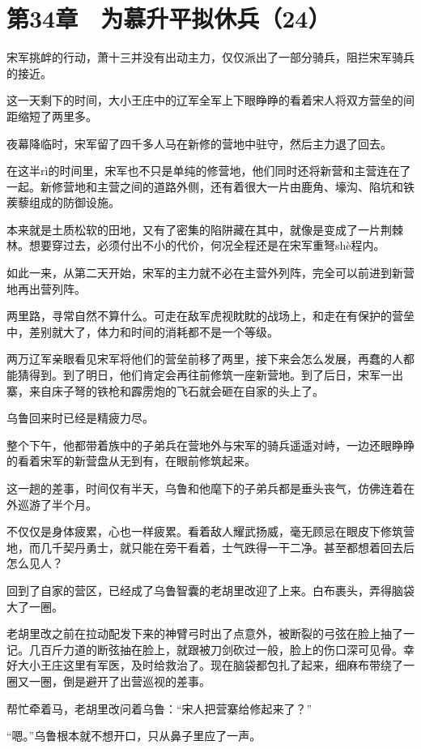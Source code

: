 \section{第34章　为慕升平拟休兵（24）}

宋军挑衅的行动，萧十三并没有出动主力，仅仅派出了一部分骑兵，阻拦宋军骑兵的接近。

这一天剩下的时间，大小王庄中的辽军全军上下眼睁睁的看着宋人将双方营垒的间距缩短了两里多。

夜幕降临时，宋军留了四千多人马在新修的营地中驻守，然后主力退了回去。

在这半rì的时间里，宋军也不只是单纯的修营地，他们同时还将新营和主营连在了一起。新修营地和主营之间的道路外侧，还有着很大一片由鹿角、壕沟、陷坑和铁蒺藜组成的防御设施。

本来就是土质松软的田地，又有了密集的陷阱藏在其中，就像是变成了一片荆棘林。想要穿过去，必须付出不小的代价，何况全程还是在宋军重弩shè程内。

如此一来，从第二天开始，宋军的主力就不必在主营外列阵，完全可以前进到新营地再出营列阵。

两里路，寻常自然不算什么。可走在敌军虎视眈眈的战场上，和走在有保护的营垒中，差别就大了，体力和时间的消耗都不是一个等级。

两万辽军亲眼看见宋军将他们的营垒前移了两里，接下来会怎么发展，再蠢的人都能猜得到。到了明日，他们肯定会再往前修筑一座新营地。到了后日，宋军一出寨，来自床子弩的铁枪和霹雳炮的飞石就会砸在自家的头上了。

乌鲁回来时已经是精疲力尽。

整个下午，他都带着族中的子弟兵在营地外与宋军的骑兵遥遥对峙，一边还眼睁睁的看着宋军的新营盘从无到有，在眼前修筑起来。

这一趟的差事，时间仅有半天，乌鲁和他麾下的子弟兵都是垂头丧气，仿佛连着在外巡游了半个月。

不仅仅是身体疲累，心也一样疲累。看着敌人耀武扬威，毫无顾忌在眼皮下修筑营地，而几千契丹勇士，就只能在旁干看着，士气跌得一干二净。甚至都想着回去后怎么见人？

回到了自家的营区，已经成了乌鲁智囊的老胡里改迎了上来。白布裹头，弄得脑袋大了一圈。

老胡里改之前在拉动配发下来的神臂弓时出了点意外，被断裂的弓弦在脸上抽了一记。几百斤力道的断弦抽在脸上，就跟被刀剑砍过一般，脸上的伤口深可见骨。幸好大小王庄这里有军医，及时给救治了。现在脑袋都包扎了起来，细麻布带绕了一圈又一圈，倒是避开了出营巡视的差事。

帮忙牵着马，老胡里改问着乌鲁：“宋人把营寨给修起来了？”

“嗯。”乌鲁根本就不想开口，只从鼻子里应了一声。


